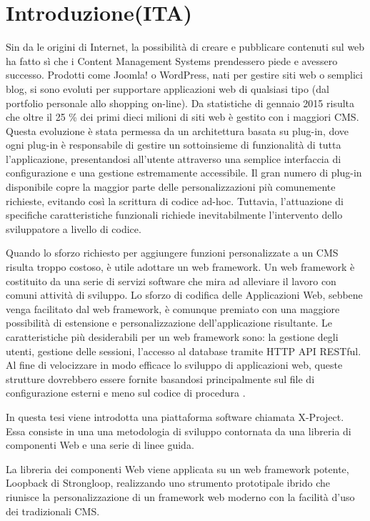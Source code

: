 \section{Introduzione(ITA)}

Sin da le origini di Internet, la possibilità di creare e pubblicare contenuti sul web ha fatto sì che i Content Management Systems prendessero piede e avessero successo. Prodotti come Joomla! o WordPress, nati per gestire siti web o semplici blog, si sono evoluti per supportare applicazioni web di qualsiasi tipo (dal portfolio personale allo shopping on-line). Da statistiche di gennaio 2015 risulta che oltre il 25 \% dei primi dieci milioni di siti web è gestito con i maggiori CMS\cite{cms_stats}. Questa evoluzione è stata permessa da un architettura basata su plug-in, dove ogni plug-in è responsabile di gestire un sottoinsieme di funzionalità di tutta l'applicazione, presentandosi all'utente attraverso una semplice interfaccia di configurazione e una gestione estremamente accessibile.
Il gran numero di plug-in disponibile copre la maggior parte delle personalizzazioni più comunemente richieste, evitando così la scrittura di codice ad-hoc. Tuttavia, l'attuazione di specifiche caratteristiche funzionali richiede inevitabilmente l'intervento dello sviluppatore a livello di codice.

Quando lo sforzo richiesto per aggiungere funzioni personalizzate a un CMS risulta troppo costoso, è utile adottare un web framework. Un web framework è costituito da una serie di servizi software che mira ad alleviare il lavoro con comuni attività di sviluppo. Lo sforzo di codifica delle Applicazioni Web, sebbene venga facilitato dal web framework, è comunque premiato con una maggiore possibilità di estensione e personalizzazione dell'applicazione risultante.
Le caratteristiche più desiderabili per un web framework sono: la gestione degli utenti, gestione delle sessioni, l'accesso al database tramite HTTP API RESTful. Al fine di velocizzare in modo efficace lo sviluppo di applicazioni web, queste strutture dovrebbero essere fornite basandosi principalmente sul file di configurazione esterni e meno sul codice di procedura \cite{MIPRO}.

In questa tesi viene introdotta una piattaforma software chiamata X-Project. Essa consiste in una una metodologia di sviluppo contornata da una libreria di componenti Web e una serie di linee guida.

La libreria dei componenti Web viene applicata su un web framework potente, Loopback di Strongloop, realizzando uno strumento prototipale ibrido che riunisce la personalizzazione di un framework web moderno con la facilità d'uso dei tradizionali CMS.

